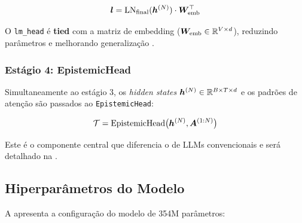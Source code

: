 \begin{equation}
    \bm{l} = \text{LN}_{\text{final}}(\bm{h}^{(N)}) \cdot \bm{W}_{\text{emb}}^\top
\end{equation}

O \texttt{lm\_head} \'e \textbf{tied} com a matriz de embedding
($\bm{W}_{\text{emb}} \in \mathbb{R}^{V \times d}$), reduzindo par\^ametros e
melhorando generaliza\c{c}\~ao \cite{press2017tying}.

\subsubsection{Est\'agio 4: EpistemicHead}

Simultaneamente ao est\'agio 3, os \textit{hidden states}
$\bm{h}^{(N)} \in \mathbb{R}^{B \times T \times d}$ e os padr\~oes de aten\c{c}\~ao
s\~ao passados ao \texttt{EpistemicHead}:

\begin{equation}
    \mathcal{T} = \text{EpistemicHead}\big(\bm{h}^{(N)}, \bm{A}^{(1:N)}\big)
\end{equation}

Este \'e o componente central que diferencia o \aletheion{} de LLMs convencionais
e ser\'a detalhado na .

\subsection{Hiperpar\^ametros do Modelo}

A  apresenta a configura\c{c}\~ao do modelo de 354M
par\^ametros:

